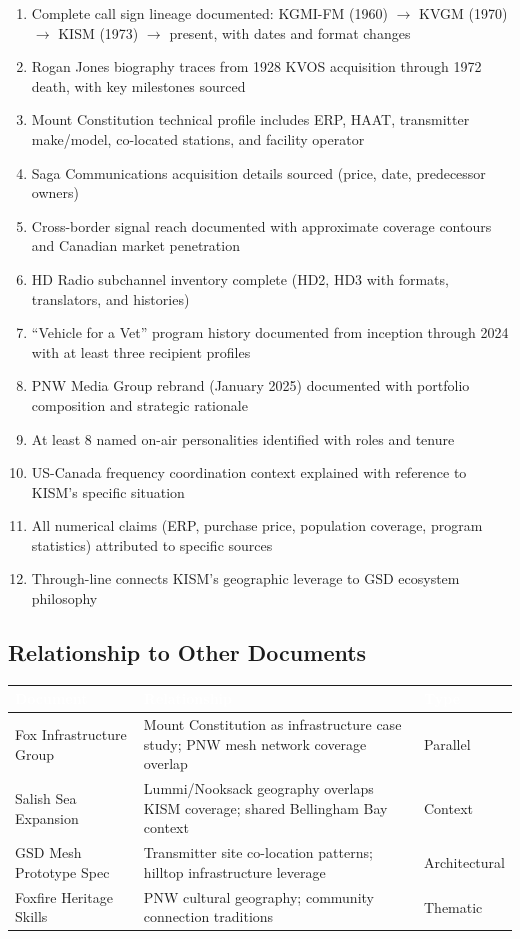 \documentclass[11pt,letterpaper]{article}
\newcommand{\tableheader}[1]{\textbf{\sffamily\textcolor{white}{#1}}}
\begin{document}
\begin{enumerate}[nosep]
\item Complete call sign lineage documented: KGMI-FM (1960) $\rightarrow$ KVGM (1970) $\rightarrow$ KISM (1973) $\rightarrow$ present, with dates and format changes
\item Rogan Jones biography traces from 1928 KVOS acquisition through 1972 death, with key milestones sourced
\item Mount Constitution technical profile includes ERP, HAAT, transmitter make/model, co-located stations, and facility operator
\item Saga Communications acquisition details sourced (price, date, predecessor owners)
\item Cross-border signal reach documented with approximate coverage contours and Canadian market penetration
\item HD Radio subchannel inventory complete (HD2, HD3 with formats, translators, and histories)
\item ``Vehicle for a Vet'' program history documented from inception through 2024 with at least three recipient profiles
\item PNW Media Group rebrand (January 2025) documented with portfolio composition and strategic rationale
\item At least 8 named on-air personalities identified with roles and tenure
\item US-Canada frequency coordination context explained with reference to KISM's specific situation
\item All numerical claims (ERP, purchase price, population coverage, program statistics) attributed to specific sources
\item Through-line connects KISM's geographic leverage to GSD ecosystem philosophy
\end{enumerate}

\subsection{Relationship to Other Documents}

\begin{center}
\begin{tabularx}{\textwidth}{L{4cm}XC{2.5cm}}
\toprule
{}
\tableheader{Document} & \tableheader{Relationship} & \tableheader{Type} \\
\midrule
Fox Infrastructure Group & Mount Constitution as infrastructure case study; PNW mesh network coverage overlap & Parallel \\
Salish Sea Expansion & Lummi/Nooksack geography overlaps KISM coverage; shared Bellingham Bay context & Context \\
GSD Mesh Prototype Spec & Transmitter site co-location patterns; hilltop infrastructure leverage & Architectural \\
Foxfire Heritage Skills & PNW cultural geography; community connection traditions & Thematic \\
\bottomrule
\end{tabularx}
\end{center}
\end{document}
